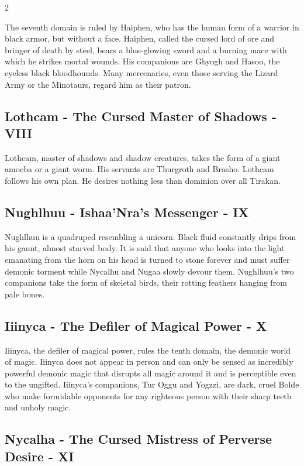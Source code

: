 \begin{multicols}{2}
{The seventh domain is ruled by Haiphen, who has the human form of a warrior in black armor, but without a face. Haiphen, called the cursed lord of ore and bringer of death by steel, bears a blue-glowing sword and a burning mace with which he strikes mortal wounds. His companions are Ghyogh and Hasoo, the eyeless black bloodhounds. Many mercenaries, even those serving the Lizard Army or the Minotaurs, regard him as their patron.

\subsection{Lothcam - The Cursed Master of Shadows - VIII}\label{subsec:lothcam-der-verfluchte-beherrscher-der-schatten}

Lothcam, master of shadows and shadow creatures, takes the form of a giant amoeba or a giant worm. His servants are Thurgroth and Brasho. Lothcam follows his own plan. He desires nothing less than dominion over all Tirakan.

\subsection{Nughlhuu - Ishaa'Nra's Messenger - IX}\label{subsec:nughlhuu-der-bote-ishaa'nras}

Nughlhuu is a quadruped resembling a unicorn. Black fluid constantly drips from his gaunt, almost starved body. It is said that anyone who looks into the light emanating from the horn on his head is turned to stone forever and must suffer demonic torment while Nycalhu and Nugaa slowly devour them. Nughlhuu's two companions take the form of skeletal birds, their rotting feathers hanging from pale bones.

\subsection{Iiinyca - The Defiler of Magical Power - X}\label{subsec:iiinyca-der-schander-der-magischen-kraft}

Iiinyca, the defiler of magical power, rules the tenth domain, the demonic world of magic. Iiinyca does not appear in person and can only be sensed as incredibly powerful demonic magic that disrupts all magic around it and is perceptible even to the ungifted. Iiinyca's companions, Tur Oggu and Yogzzi, are dark, cruel Bolde who make formidable opponents for any righteous person with their sharp teeth and unholy magic.

\subsection{Nycalha - The Cursed Mistress of Perverse Desire - XI}\label{subsec:nycalha-die-verfluchte-herrin-der-perversen-lust}

}
\end{multicols}
